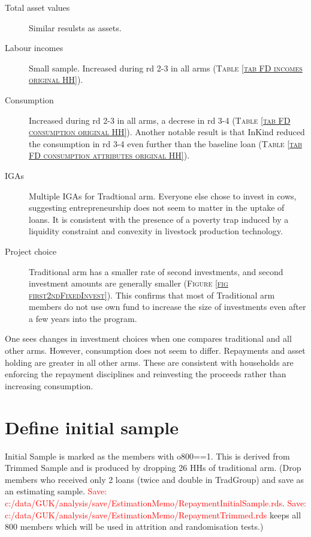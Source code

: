 \begin{description}
\item[Total asset values]	Similar resulsts as assets.
\item[Labour incomes]	Small sample. Increased during rd 2-3 in all arms (\textsc{\normalsize Table \ref{tab FD incomes original HH}}). 
\item[Consumption]	Increased during rd 2-3 in all arms, a decrese in rd 3-4 (\textsc{\normalsize Table \ref{tab FD consumption original HH}}). Another notable result is that \textsf{InKind} reduced the consumption in rd 3-4 even further than the baseline loan (\textsc{\normalsize Table \ref{tab FD consumption attributes original HH}}).
\item[IGAs]	Multiple IGAs for \textsf{Tradtional} arm. Everyone else chose to invest in cows, suggesting entrepreneurship does not seem to matter in the uptake of loans. It is consistent with the presence of a poverty trap induced by a liquidity constraint and convexity in livestock production technology.
\item[Project choice]	\textsf{Traditional} arm has a smaller rate of second investments, and second investment amounts are generally smaller (\textsc{\footnotesize Figure \ref{fig first2ndFixedInvest}}). This confirms that most of \textsf{Traditional} arm members do not use own fund to increase the size of investments even after a few years into the program.
\end{description}

One sees changes in investment choices when one compares \textsf{traditional} and all other arms. However, consumption does not seem to differ. Repayments and asset holding are greater in all other arms. These are consistent with households are enforcing the repayment disciplines and reinvesting the proceeds rather than increasing consumption. 





\newpage



\section{Define initial sample}


Initial Sample is marked as the members with \textsf{o800==1}. This is derived from Trimmed Sample and is produced by dropping 26 HHs of traditional arm. (Drop members who received only 2 loans (twice and double in \textsf{TradGroup}) and save as an estimating sample. \textcolor{red}{Save: c:/data/GUK/analysis/save/EstimationMemo/RepaymentInitialSample.rds}. \textcolor{red}{Save: c:/data/GUK/analysis/save/EstimationMemo/RepaymentTrimmed.rds} keeps all 800 members which will be used in attrition and randomisation tests.)


